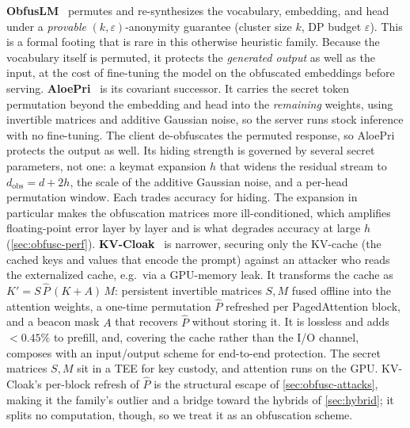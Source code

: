 \textbf{ObfusLM}~\citep{obfuslm} permutes and re-synthesizes the vocabulary, embedding, and
head under a \emph{provable} $(k,\varepsilon)$-anonymity guarantee (cluster size $k$, DP
budget $\varepsilon$). This is a formal footing that is rare in this otherwise heuristic
family. Because the vocabulary itself is permuted, it protects the \emph{generated output} as
well as the input, at the cost of fine-tuning the model on the obfuscated embeddings before
serving. \textbf{AloePri}~\citep{lin_aloepri} is its covariant successor. It carries the
secret token permutation beyond the embedding and head into the \emph{remaining} weights,
using invertible matrices and additive Gaussian noise, so the server runs stock inference
with no fine-tuning. The client de-obfuscates the permuted response, so AloePri protects the
output as well. Its hiding strength is governed by several secret parameters, not one: a
keymat expansion $h$ that widens the residual stream to $d_{\text{obs}}{=}d{+}2h$, the scale
of the additive Gaussian noise, and a per-head permutation window. Each trades accuracy for
hiding. The expansion in particular makes the obfuscation matrices more ill-conditioned,
which amplifies floating-point error layer by layer and is what degrades accuracy at large
$h$ (\cref{sec:obfusc-perf}). \textbf{KV-Cloak}~\citep{luo_shadowcache} is narrower, securing only the KV-cache (the cached
keys and values that encode the prompt) against an attacker who reads the externalized cache,
e.g.\ via a GPU-memory leak. It transforms the cache as $K'{=}S\,\hat{P}\,(K{+}A)\,M$:
persistent invertible matrices $S,M$ fused offline into the attention weights, a one-time
permutation $\hat{P}$ refreshed per PagedAttention block, and a beacon mask $A$ that recovers
$\hat{P}$ without storing it. It is lossless and adds ${<}0.45\%$ to prefill, and, covering the cache
rather than the I/O channel, composes with an input/output scheme for end-to-end protection.
The secret matrices $S,M$ sit in a TEE for key custody, and attention runs on the GPU. KV-Cloak's
per-block refresh of $\hat{P}$ is the structural escape of \cref{sec:obfusc-attacks}, making it the
family's outlier and a bridge toward the hybrids of \cref{sec:hybrid}; it splits no computation,
though, so we treat it as an obfuscation scheme.


